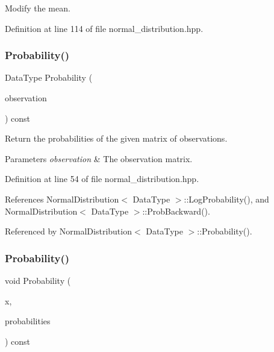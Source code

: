 Modify the mean. 



Definition at line 114 of file normal\+\_\+distribution.\+hpp.

\mbox{\label{classmlpack_1_1ann_1_1NormalDistribution_a3e6dc6d5dcfdbaa446afaa6cb87b9e26}} 
\subsubsection{Probability()\hspace{0.1cm}{\footnotesize\ttfamily [1/2]}}
{\footnotesize\ttfamily Data\+Type Probability (\begin{DoxyParamCaption}\item[{const Data\+Type \&}]{observation }\end{DoxyParamCaption}) const\hspace{0.3cm}{\ttfamily [inline]}}



Return the probabilities of the given matrix of observations. 


\begin{DoxyParams}{Parameters}
{\em observation} & The observation matrix. \\
\hline
\end{DoxyParams}


Definition at line 54 of file normal\+\_\+distribution.\+hpp.



References Normal\+Distribution$<$ Data\+Type $>$\+::\+Log\+Probability(), and Normal\+Distribution$<$ Data\+Type $>$\+::\+Prob\+Backward().



Referenced by Normal\+Distribution$<$ Data\+Type $>$\+::\+Probability().

\mbox{\label{classmlpack_1_1ann_1_1NormalDistribution_a6512ca09816d0ae2f7edbeffc8f86b8e}} 
\subsubsection{Probability()\hspace{0.1cm}{\footnotesize\ttfamily [2/2]}}
{\footnotesize\ttfamily void Probability (\begin{DoxyParamCaption}\item[{const Data\+Type \&}]{x,  }\item[{Data\+Type \&}]{probabilities }\end{DoxyParamCaption}) const\hspace{0.3cm}{\ttfamily [inline]}}



